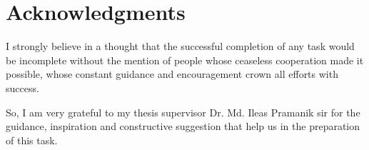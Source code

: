 \newpage
\chapter*{\textbf{Acknowledgments}}

I strongly believe in a thought that the successful completion of any task would be incomplete without the mention of people whose ceaseless cooperation made it possible, whose constant guidance and encouragement crown all efforts with success. 

So, I am very grateful to my thesis supervisor Dr. Md. Ileas Pramanik sir for the guidance, inspiration and constructive suggestion that help us in the preparation of this task.
